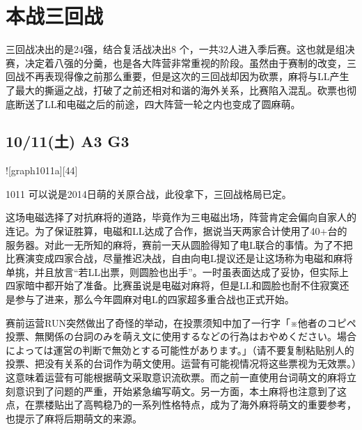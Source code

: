 \section{本战三回战}

三回战决出的是24强，结合复活战决出8 个，一共32人进入季后赛。这也就是组决赛，决定着八强的分羹，也是各大阵营非常重视的阶段。虽然由于赛制的改变，三回战不再表现得像之前那么重要，但是这次的三回战却因为砍票，麻将与LL产生了最大的撕逼之战，打破了之前还相对和谐的海外关系，比赛陷入混乱。砍票也彻底断送了LL和电磁之后的前途，四大阵营一轮之内也变成了圆麻萌。

\subsection{10/11(土) A3 G3}


![graph1011a][44]

1011 可以说是2014日萌的关原合战，此役拿下，三回战格局已定。

这场电磁选择了对抗麻将的道路，毕竟作为三电磁出场，阵营肯定会偏向自家人的连记。为了保证胜算，电磁和LL达成了合作，据说当天两家合计使用了40+台的服务器。对此一无所知的麻将，赛前一天从圆脸得知了电L联合的事情。为了不把比赛演变成四家合战，尽量推迟决战，自由向电L提议还是让这场称为电磁和麻将单挑，并且放言“若LL出票，则圆脸也出手”。一时虽表面达成了妥协，但实际上四家暗中都开始了准备。比赛虽说是电磁对麻将，但是LL和圆脸也耐不住寂寞还是参与了进来，那么今年圆麻对电L的四家超多重合战也正式开始。

赛前运营RUN突然做出了奇怪的举动，在投票须知中加了一行字「※他者のコピペ投票、無関係の台詞のみを萌え文に使用するなどの行為はおやめください。場合によっては運営の判断で無効とする可能性があります。」（请不要复制粘贴别人的投票、把没有关系的台词作为萌文使用。运营有可能视情况将这些票视为无效票。）这意味着运营有可能根据萌文采取意识流砍票。而之前一直使用台词萌文的麻将立刻意识到了问题的严重，开始紧急编写萌文。另一方面，本土麻将也注意到了这点，在票楼贴出了高鸭稳乃的一系列性格特点，成为了海外麻将萌文的重要参考，也提示了麻将后期萌文的来源。

